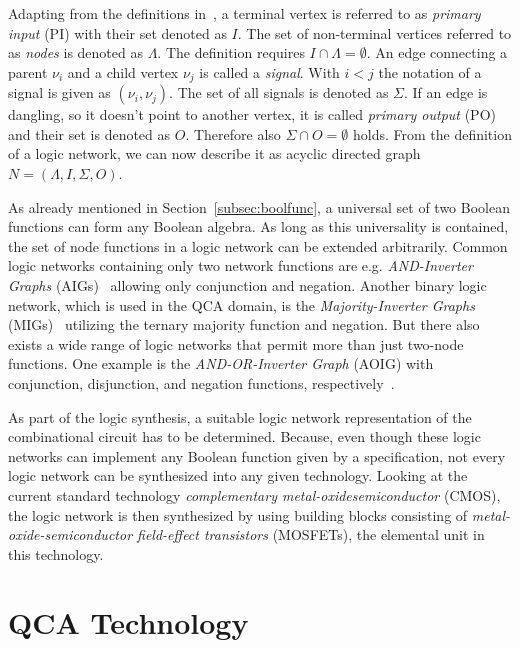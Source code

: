 Adapting from the definitions in~\cite{Walter}, a terminal vertex is referred to as \textit{primary input} (PI) with their set denoted as $I$. The set of non-terminal vertices referred to as \textit{nodes} is denoted as $\Lambda$. The definition requires $I \cap \Lambda = \emptyset$. An edge connecting a parent $\nu_i$ and a child vertex $\nu_j$ is called a \textit{signal}. With $i < j$ the notation of a signal is given as $(\nu_i, \nu_j)$. The set of all signals is denoted as $\Sigma$. If an edge is dangling, so it doesn't point to another vertex, it is called \textit{primary output} (PO) and their set is denoted as $O$. Therefore also $\Sigma \cap O = \emptyset$ holds. From the definition of a logic network, we can now describe it as acyclic directed graph $N = (\Lambda, I, \Sigma, O)$.

As already mentioned in Section~\ref{subsec:boolfunc}, a universal set of two Boolean functions can form any Boolean algebra.
As long as this universality is contained, the set of node functions in a logic network can be extended arbitrarily. Common logic networks containing only two network functions are e.g. \textit{AND-Inverter Graphs} (AIGs)~\cite{bandyopadhyay2019design} allowing only conjunction and negation. Another binary logic network, which is used in the QCA domain, is the \textit{Majority-Inverter Graphs} (MIGs)~\cite{bandyopadhyay2019design} utilizing the ternary majority function and negation. But there also exists a wide range of logic networks that permit more than just two-node functions. One example is the \textit{AND-OR-Inverter Graph} (AOIG) with conjunction, disjunction, and negation functions, respectively~\cite{Walter}.

As part of the logic synthesis, a suitable logic network representation of the combinational circuit has to be determined. Because, even though these logic networks can implement any Boolean function given by a specification, not every logic network can be synthesized into any given technology.
Looking at the current standard technology \textit{complementary metal-oxidesemiconductor} (CMOS), the logic network is then synthesized by using building blocks consisting of \textit{metal-oxide-semiconductor field-effect transistors} (MOSFETs), the elemental unit in this technology.

\section{QCA Technology}\label{sec:QCATec}

